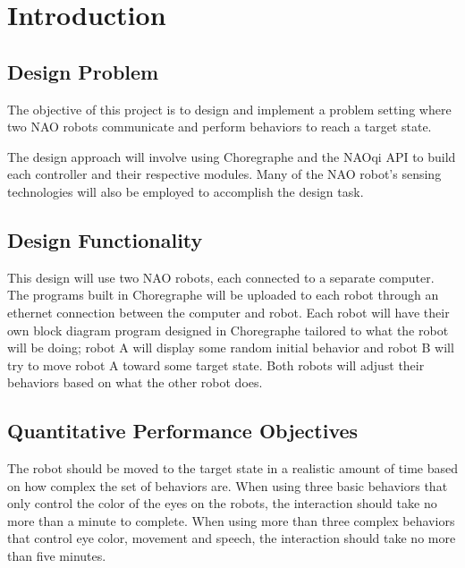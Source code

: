 \chapter{Introduction}
\label{ch:introduction}
\section{Design Problem}
The objective of this project is to design and implement a problem setting where two NAO robots communicate and perform behaviors to reach a target state.\par 

The design approach will involve using Choregraphe and the NAOqi API to build each controller and their respective modules. Many of the NAO robot’s sensing technologies will also be employed to accomplish the design task. \par


\section{Design Functionality}
This design will use two NAO robots, each connected to a separate computer. The programs built in Choregraphe will be uploaded to each robot through an ethernet connection between the computer and robot. Each robot will have their own block diagram program designed in Choregraphe tailored to what the robot will be doing; robot A will display some random initial behavior and robot B will try to move robot A toward some target state. Both robots will adjust their behaviors based on what the other robot does.
\par 
\section{Quantitative Performance Objectives}
The robot should be moved to the target state in a realistic amount of time based on how complex the set of behaviors are. When using three basic behaviors that only control the color of the eyes on the robots, the interaction should take no more than a minute to complete. When using more than three complex behaviors that control eye color, movement and speech, the interaction should take no more than five minutes. \par




